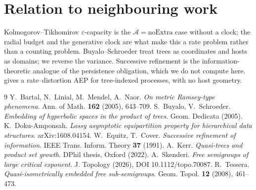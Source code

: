 \documentclass[11pt,a4paper]{article}
\theoremstyle{plain}
\theoremstyle{definition}
\theoremstyle{remark}
\begin{document}
\section{Relation to neighbouring work}

Kolmogorov--Tikhomirov $\varepsilon$-capacity is the $\mathcal A=\mathrm{noExtra}$
case without a clock; the radial budget and the generative clock are what make
this a rate problem rather than a counting problem. Buyalo--Schroeder
\cite{BuyaloSchroeder} treat trees as coordinates and hosts as domains; we
reverse the variance. Successive refinement \cite{EquitzCover} is the
information-theoretic analogue of the persistence obligation, which we do not
compute here. \cite{DokuAmponsah} gives a rate--distortion AEP for
tree-indexed processes, with no host geometry.

\begin{thebibliography}{9}
 Y.~Bartal, N.~Linial, M.~Mendel, A.~Naor.
  \emph{On metric Ramsey-type phenomena}. Ann. of Math. \textbf{162} (2005), 643--709.
 S.~Buyalo, V.~Schroeder.
  \emph{Embedding of hyperbolic spaces in the product of trees}. Geom. Dedicata (2005).
 K.~Doku-Amponsah.
  \emph{Lossy asymptotic equipartition property for hierarchical data structures}. arXiv:1608.04154.
 W.~Equitz, T.~Cover.
  \emph{Successive refinement of information}. IEEE Trans. Inform. Theory \textbf{37} (1991).
 A.~Kerr. \emph{Quasi-trees and product set growth}. DPhil thesis, Oxford (2022).
 A.~Skenderi. \emph{Free semigroups of large critical exponent}.
  J. Topology (2026), DOI 10.1112/topo.70087.
 R.~Tessera. \emph{Quasi-isometrically embedded free sub-semigroups}.
  Geom. Topol. \textbf{12} (2008), 461--473.
\end{thebibliography}
\end{document}
